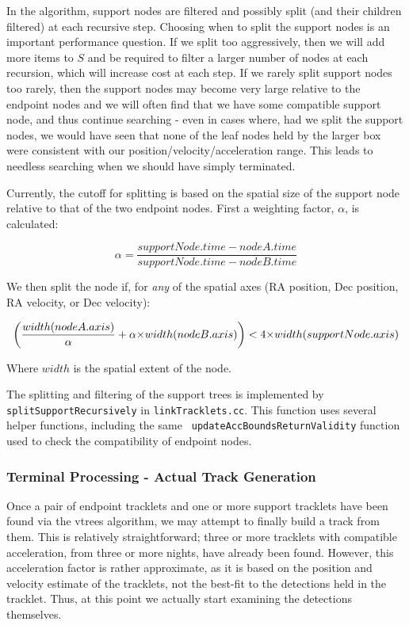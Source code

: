 In the algorithm, support nodes are filtered and possibly split (and
their children filtered) at each recursive step.  Choosing when to
split the support nodes is an important performance question.  If we
split too aggressively, then we will add more items to $S$ and be
required to filter a larger number of nodes at each recursion, which
will increase cost at each step.  If we rarely split support nodes too
rarely, then the support nodes may become very large relative to the
endpoint nodes and we will often find that we have some compatible
support node, and thus continue searching - even in cases where, had
we split the support nodes, we would have seen that none of the leaf
nodes held by the larger box were consistent with our
position/velocity/acceleration range.  This leads to needless
searching when we should have simply terminated.

Currently, the cutoff for splitting is based on the spatial size of
the support node relative to that of the two endpoint nodes.  First
a weighting factor, $\alpha$, is calculated:

\begin{equation}
\alpha = \frac{supportNode.time - nodeA.time}{supportNode.time - nodeB.time}
\end{equation}

We then split the node if, for \textit{any} of the spatial axes (RA position, Dec position, RA velocity, or Dec velocity):

\begin{equation}
\bigg(\frac{width(nodeA.axis)}{\alpha} + \alpha \hbox{$\times$} width(nodeB.axis)\bigg) < 4 \hbox{$\times$} width(supportNode.axis)
\end{equation}

Where $width$ is the spatial extent of the node.

The splitting and filtering of the support trees is implemented by
{\tt splitSupportRecursively} in {\tt linkTracklets.cc}.  This
function uses several helper functions, including the same {\tt
  updateAccBoundsReturnValidity} function used to check the
compatibility of endpoint nodes.


\subsubsection{Terminal Processing - Actual Track Generation}

Once a pair of endpoint tracklets and one or more support tracklets
have been found via the vtrees algorithm, we may attempt to finally
build a track from them.  This is relatively straightforward; three or
more tracklets with compatible acceleration, from three or more
nights, have already been found.  However, this acceleration factor is
rather approximate, as it is based on the position and velocity
estimate of the tracklets, not the best-fit to the detections held in
the tracklet.  Thus, at this point we actually start examining the
detections themselves.

